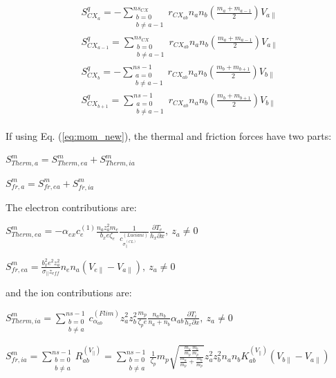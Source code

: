 \documentclass[a4paper,10pt]{report}
\begin{document}
\begin{eqnarray}
S_{CX_a}^q = - \sum \limits^{ns_{CX}}_{\substack{b=0 \\ b \neq a-1}} r_{CX_{ab}} n_a n_b \left( \frac{m_a+m_{a-1}}{2} \right) V_{a \parallel} \\
S_{CX_{a-1}}^q = \sum \limits^{ns_{CX}}_{\substack{b=0 \\ b \neq a-1}} r_{CX_{ab}} n_a n_b \left( \frac{m_a+m_{a-1}}{2} \right) V_{a \parallel} \\
S_{CX_b}^q = - \sum \limits^{ns-1}_{\substack{a=0 \\ b \neq a-1}} r_{CX_{ab}} n_a n_b \left( \frac{m_b+m_{b+1}}{2} \right) V_{b \parallel} \\
S_{CX_{b+1}}^q = \sum \limits^{ns-1}_{\substack{a=0 \\ b \neq a-1}} r_{CX_{ab}} n_a n_b \left( \frac{m_b+m_{b+1}}{2} \right) V_{b \parallel}
\end{eqnarray}


If using Eq. (\ref{eq:mom_new}), the thermal and friction forces have two parts:

$S_{Therm,a}^m = S_{Therm,ea}^m + S_{Therm,ia}^m$

$S_{fr,a}^m = S_{fr,ea}^m + S_{fr,ia}^m$

The electron contributions are:

$S_{Therm,ea}^m = - \alpha_{ex} c_e^{(1)} \frac{n_a z_a^2 m_e}{b_x e \zeta_e} \frac{1}{c_{\sigma^{(CL)}_{\parallel}}^{(Luciani)}} \frac{\partial T_e}{h_x \partial x}, ~ z_a \ne 0$

$S_{fr,ea}^m = \frac{b_x^2 e^2 z_a^2}{\sigma_\parallel z_{eff}} n_e n_a \left( V_{e \parallel} - V_{a \parallel} \right), ~ z_a \ne 0$

and the ion contributions are:

$S_{Therm,ia}^m = \sum \limits_{\substack{b=0 \\ b \ne a}}^{ns - 1} c_{\alpha_{ab}}^{(Flim)} z_a^2 z_b^2 \frac{m_p}{\zeta_p e} \frac{n_a n_b}{n_a + n_b} \alpha_{ab} \frac{\partial T_i}{h_x \partial x}, ~z_a \ne 0$

$S_{fr,ia}^m = \sum \limits_{\substack{b=0 \\ b \ne a}}^{ns - 1} R_{ab}^{(V_\parallel)} = \sum \limits_{\substack{b=0 \\ b \ne a}}^{ns - 1} \frac{1}{\zeta_p} m_p \sqrt{\frac{\frac{m_a}{m_p} \frac{m_b}{m_p}}{\frac{m_a}{m_p} + \frac{m_b}{m_p}}} z_a^2 z_b^2 n_a n_b K_{ab}^{(V_\parallel)} \left( V_{b \parallel} - V_{a \parallel} \right)$
\end{document}
